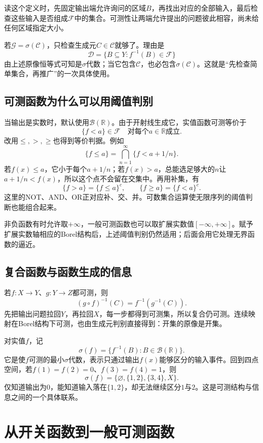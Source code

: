 读这个定义时，先固定输出端允许询问的区域$B$，再找出对应的全部输入，最后检查这些输入是否组成$\mathcal F$中的集合。可测性让两端允许提出的问题彼此相容，尚未给任何区域指定大小。

若$\mathcal G=\sigma(\mathcal C)$，只检查生成元$C\in\mathcal C$就够了。理由是
\[
 \mathcal D=\{B\subseteq Y:f^{-1}(B)\in\mathcal F\}
\]
由上述原像恒等式可知是$\sigma$代数；当它包含$\mathcal C$，也必包含$\sigma(\mathcal C)$。这就是“先检查简单集合，再推广”的一次具体使用。

\subsection{可测函数为什么可以用阈值判别}

当输出是实数时，默认使用$\mathcal B(\mathbb R)$。由于开射线生成它，实值函数可测等价于
\[
 \{f<a\}\in\mathcal F\quad\text{对每个$a\in\mathbb R$成立}.
\]
改用$\leq,>,\geq$也得到等价判据。例如
\[
 \{f\leq a\}=\bigcap_{n=1}^{\infty}\{f<a+1/n\}.
\]
若$f(x)\leq a$，它小于每个$a+1/n$；若$f(x)>a$，总能选足够大的$n$让$a+1/n<f(x)$，所以这个点不会留在交集中。再用补集，有
\[
 \{f>a\}=\{f\leq a\}^c,\qquad
 \{f\geq a\}=\{f<a\}^c.
\]
这里的NOT、AND、OR正对应补、交、并。可数集合运算使无限序列的阈值判断也能组合起来。

非负函数有时允许取$+\infty$，一般可测函数也可以取扩展实数值$[-\infty,+\infty]$。赋予扩展实数轴相应的Borel结构后，上述阈值判别仍然适用；后面会用它处理无界函数的逼近。

\subsection{复合函数与函数生成的信息}

若$f:X\to Y$、$g:Y\to Z$都可测，则
\[
 (g\circ f)^{-1}(C)=f^{-1}(g^{-1}(C)).
\]
先把输出问题拉回$Y$，再拉回$X$，每一步都得到可测集，所以复合仍可测。连续映射在Borel结构下可测，也由生成元判别直接得到：开集的原像是开集。

对实值$f$，记
\[
 \sigma(f)=\{f^{-1}(B):B\in\mathcal B(\mathbb R)\}.
\]
它是使$f$可测的最小$\sigma$代数，表示只通过输出$f(x)$能够区分的输入事件。回到四点空间，若$f(1)=f(2)=0$、$f(3)=f(4)=1$，则
\[
 \sigma(f)=\{\varnothing,\{1,2\},\{3,4\},X\}.
\]
仅知道输出为$0$，能知道输入落在$\{1,2\}$，却无法继续区分$1$与$2$。这是可测结构与信息之间的一个具体联系。

\section{从开关函数到一般可测函数}

